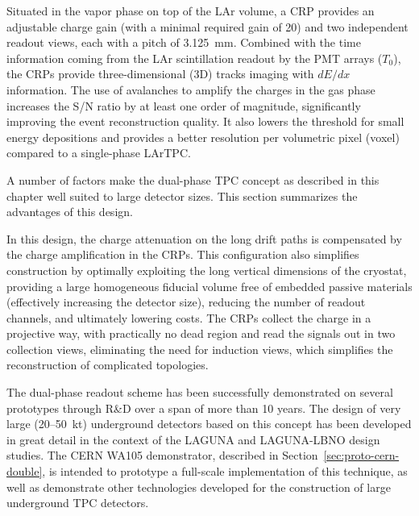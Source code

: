 Situated in the vapor phase on top of the LAr volume, a CRP provides
an adjustable charge gain (with a minimal required gain of 20) and two
independent readout views, each with a pitch of 3.125~mm.  Combined
with the time information coming from the LAr scintillation readout by
the PMT arrays ($T_0$), the CRPs provide three-dimensional (3D) tracks
imaging with $dE/dx$ information. 
The use of avalanches to amplify the charges in the gas phase increases
the S/N ratio %
by at least one order of magnitude, %
significantly
improving the event reconstruction quality. It also lowers the
threshold for small energy depositions and provides a better
resolution per volumetric pixel (voxel) compared to a single-phase
LArTPC.


A number of factors make the dual-phase TPC concept as described in this chapter 
well suited to large detector sizes.  This section summarizes the advantages of this design.

In this design, the charge attenuation on the long drift paths is compensated by the
charge amplification in the CRPs.  This configuration also simplifies
construction by optimally exploiting the long vertical dimensions of
the cryostat, providing a large homogeneous fiducial volume %
free of embedded passive materials (effectively increasing the detector size),
reducing the number of readout channels, %
and ultimately lowering costs.  
The CRPs collect the charge in a projective way, 
with practically no dead region and read the signals out %
in two collection views, eliminating the need for %
induction views, which %
simplifies the reconstruction of complicated topologies. 

The dual-phase readout scheme has been successfully demonstrated on
several prototypes through R\&D over a span of more than 10 years.  The
design of very large (20--50~kt) underground detectors based on this
concept has been developed in great detail in the context of the
LAGUNA and LAGUNA-LBNO design studies.  The CERN WA105 demonstrator, %
described in Section~\ref{sec:proto-cern-double}, is intended to prototype %
a full-scale implementation of this technique, as
well as demonstrate other technologies developed for the construction of large
underground TPC detectors.  


